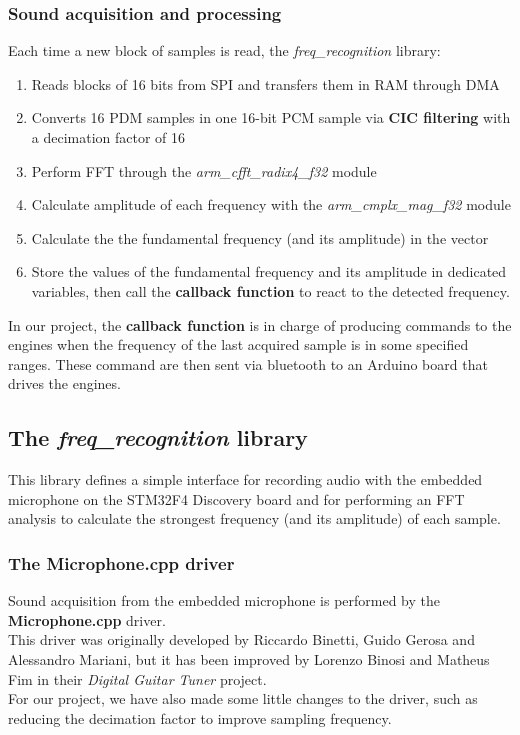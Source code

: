\subsubsection{Sound acquisition and processing}
Each time a new block of samples is read, the \textit{freq\_recognition} library:
\begin{enumerate}
	\item Reads blocks of 16 bits from SPI and transfers them in RAM through DMA
	\item  Converts 16 PDM samples in one 16-bit PCM sample via \textbf{CIC filtering} with a decimation factor of 16
	\item Perform FFT through the \textit{arm\_cfft\_radix4\_f32}  module
	\item Calculate amplitude of each frequency with the \textit{arm\_cmplx\_mag\_f32} module
	\item Calculate the the fundamental frequency (and its amplitude) in the vector
	\item Store the values of the fundamental frequency and its amplitude in dedicated variables, then call the \textbf{callback function} to react to the detected frequency.
\end{enumerate}
In our project, the \textbf{callback function} is in charge of producing commands to the engines when the frequency of the last acquired sample is in some specified ranges. These command are then sent via bluetooth to an Arduino board that drives the engines.


\subsection{The \textit{freq\_recognition} library}
This library defines a simple interface for recording audio with the embedded microphone on the STM32F4 Discovery board and for performing an FFT analysis to calculate the strongest frequency (and its amplitude) of each sample.

\subsubsection{The Microphone.cpp driver}
Sound acquisition from the embedded microphone is performed by the \textbf{Microphone.cpp} driver. \\
This driver was originally developed by Riccardo Binetti, Guido Gerosa and Alessandro Mariani, but it has been improved by Lorenzo Binosi and Matheus Fim in their \textit{Digital Guitar Tuner} project. \\
For our project, we have also made some little changes to the driver, such as reducing the decimation factor to improve sampling frequency.

